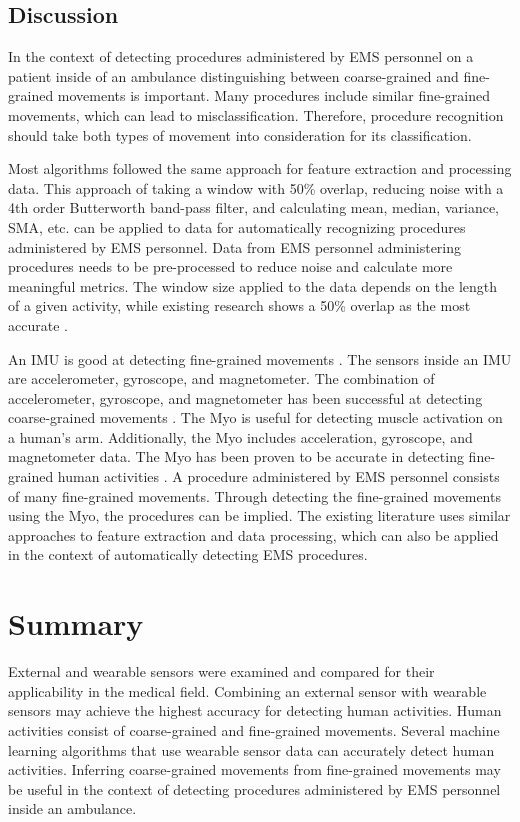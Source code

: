 \subsection{Discussion}
In the context of detecting procedures administered by EMS personnel on a patient inside of an ambulance distinguishing between coarse-grained and fine-grained movements is important. Many procedures include similar fine-grained movements, which can lead to misclassification. Therefore, procedure recognition should take both types of movement into consideration for its classification.
\par Most algorithms followed the same approach for feature extraction and processing data. This approach of taking a window with 50\% overlap, reducing noise with a 4th order Butterworth band-pass filter, and calculating mean, median, variance, SMA, etc. can be applied to data for automatically recognizing procedures administered by EMS personnel. Data from EMS personnel administering procedures needs to be pre-processed to reduce noise and calculate more meaningful metrics. The window size applied to the data depends on the length of a given activity, while existing research shows a 50\% overlap as the most accurate \cite{Wannenburg2016}.
\par An IMU is good at detecting fine-grained movements \cite{Parate2014}. The sensors inside an IMU are accelerometer, gyroscope, and magnetometer. The combination of accelerometer, gyroscope, and magnetometer has been successful at detecting coarse-grained movements \cite{Zhang2013}. The Myo is useful for detecting muscle activation on a human's arm. Additionally, the Myo includes acceleration, gyroscope, and magnetometer data. The Myo has been proven to be accurate in detecting fine-grained human activities \cite{Benalcazar2017}. A procedure administered by EMS personnel consists of many fine-grained movements. Through detecting the fine-grained movements using the Myo, the procedures can be implied. The existing literature uses similar approaches to feature extraction and data processing, which can also be applied in the context of automatically detecting EMS procedures.

\section{Summary}
\label{sec:Literature-Review:Summary}
External and wearable sensors were examined and compared for their applicability in the medical field. Combining an external sensor with wearable sensors may achieve the highest accuracy for detecting human activities. Human activities consist of coarse-grained and fine-grained movements. Several machine learning algorithms that use wearable sensor data can accurately detect human activities. Inferring coarse-grained movements from fine-grained movements may be useful in the context of detecting procedures administered by EMS personnel inside an ambulance. 